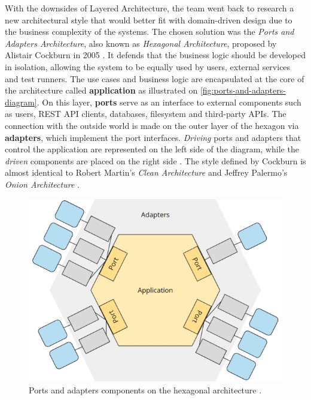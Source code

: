 With the downsides of Layered Architecture, the team went back to research a new architectural style that would better fit with domain-driven design due to the business complexity of the systems. The chosen solution was the \textit{Ports and Adapters Architecture}, also known as \textit{Hexagonal Architecture}, proposed by Alistair Cockburn in 2005 \cite{alistair-cockburn-hexagonal-architecture}. It defends that the business logic should be developed in isolation, allowing the system to be equally used by users, external services and test runners. The use cases and business logic are encapsulated at the core of the architecture called \textbf{application} as illustrated on \autoref{fig:ports-and-adapters-diagram}. On this layer, \textbf{ports} serve as an interface to external components such as users, REST API clients, databases, filesystem and third-party APIs. The connection with the outside world is made on the outer layer of the hexagon via \textbf{adapters}, which implement the port interfaces. \textit{Driving} ports and adapters that control the application are represented on the left side of the diagram, while the \textit{driven} components are placed on the right side \cite{sven-woltmann-hexagonal-architecture}. The style defined by Cockburn is almost identical to Robert Martin's \textit{Clean Architecture} \cite{robert-martin-clean-architecture-book} and Jeffrey Palermo's \textit{Onion Architecture} \cite{onion-architecture-article}.

\begin{figure}[htbp]
  \centering
  \includegraphics[scale=0.5]{Imagens/chap04/ports-and-adapters-diagram.png}
  \caption{Ports and adapters components on the hexagonal architecture \cite{sven-woltmann-hexagonal-architecture}.}
  \label{fig:ports-and-adapters-diagram}
\end{figure}

